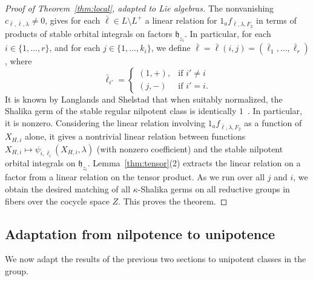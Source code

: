 \documentclass[12pt]{amsart}
\newcommand{\fh}{\mathfrak{h}}
\theoremstyle{plain}
\theoremstyle{definition}
\begin{document}
\begin{proof}[Proof of Theorem~\ref{thm:local}, adapted to Lie algebras]
The nonvanishing $c_{{\bar\ell},{\bar\ell},\lambda}\ne 0$, gives for
each ${\bar\ell}\in L\setminus L^+$ a linear relation for
$1_af_{{\bar\ell},\lambda,F_2}$ in terms of products of stable orbital
integrals on factors $\fh_{z_i}$.  In particular, for each
$i\in\{1,\ldots,r\}$, and for each $j\in\{1,\ldots,k_i\}$, we define
${\bar\ell} = {\bar\ell}(i,j) = ({\bar\ell}_1,\ldots,{\bar\ell}_r)$,
where
\[
{\bar\ell}_{i'} = \begin{cases} (1,+), &\text{if } i'\ne i\\
       (j,-) & \text{if } i' = i.
  \end{cases}
\]
It is known by Langlands and Shelstad that when suitably normalized,
the Shalika germ of the stable regular nilpotent class is identically
$1$~\cite{LSxf}.  In particular, it is nonzero.  Considering the
linear relation involving $1_af_{{\bar\ell},\lambda,F_2}$ as a
function of $X_{H,i}$ alone, it gives a nontrivial linear relation
between functions
$X_{H,i}\mapsto\psi_{i,\bar\ell_i}(X_{H,i},{\lambda})$ (with nonzero
coefficient) and the stable nilpotent orbital integrals on
$\fh_{z_i}$.  Lemma~\ref{thm:tensor}(2) extracts the linear relation
on a factor from a linear relation on the tensor product.  As we run
over all $j$ and $i$, we obtain the desired matching of all
$\kappa$-Shalika germs on all reductive groups in fibers over the
cocycle space $Z$.  This proves the theorem.
\end{proof}

\subsection{Adaptation from nilpotence to unipotence}
\label{sec:adapt}

We now adapt the results of the previous two sections to unipotent
classes in the group. 
\end{document}
